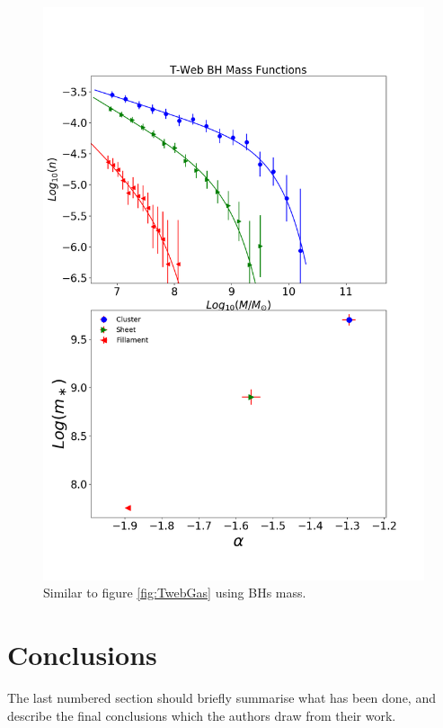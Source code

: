 \documentclass[a4paper,fleqn,usenatbib]{mnras}
\begin{document}
\begin{figure}
	\includegraphics[width=\columnwidth]{./pics/F19_T-Web_BH.png}
    \caption{Similar to figure \ref{fig:TwebGas} using BHs mass.} 
    \label{fig:TwebBH}
\end{figure}



\section{Conclusions}

The last numbered section should briefly summarise what has been done, and describe
the final conclusions which the authors draw from their work.
\end{document}
